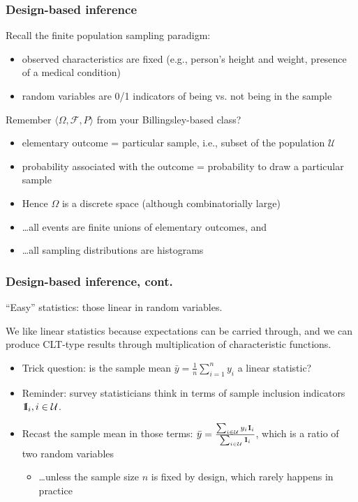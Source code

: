 \documentclass[handout]{beamer}
\newcommand{\One}{{\rm 1\kern-0.3em I}}
\begin{document}
\begin{frame}\frametitle{Design-based inference}

Recall the finite population sampling paradigm:
\begin{itemize}
    \item observed characteristics are fixed (e.g., person's height and weight, presence of a medical condition)
    \item random variables are 0/1 indicators of being vs. not being in the sample
\end{itemize}

Remember $\langle \Omega, \mathcal{F}, P \rangle$ from your Billingsley-based class?
\begin{itemize}
    \item elementary outcome = particular sample, i.e., subset of the population $\mathcal U$
    \item probability associated with the outcome = probability to draw a particular sample
    \item Hence $\Omega$ is a discrete space (although combinatorially large)
    \item \ldots all events are finite unions of elementary outcomes, and
    \item \ldots all sampling distributions are histograms
\end{itemize}

\end{frame}

\begin{frame}\frametitle{Design-based inference, cont.}

``Easy'' statistics: those linear in random variables.

\bigskip

We like linear statistics because expectations can be carried through,
and we can produce CLT-type results through multiplication of characteristic functions.

\begin{itemize}
    \item Trick question: is the sample mean $\bar y = \frac 1n\sum_{i=1}^n y_i$ a linear statistic?
	 \item Reminder: survey statisticians think in terms of sample inclusion indicators 
	       $\One_i, i\in\mathcal{U}$.
    \item Recast the sample mean in those terms: 
          $\bar y = \frac{\sum_{i\in\mathcal{U}} y_i \One_i}{\sum_{i\in\mathcal{U}} \One_i}$,
          which is a ratio of two random variables
	 \begin{itemize}
	      \item \ldots unless the sample size $n$ is fixed by design, which rarely happens in practice
	 \end{itemize}
\end{itemize}

\end{frame}
\end{document}
